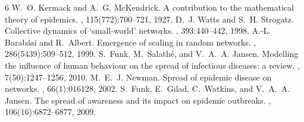\documentclass[11pt,a4paper]{article}
\begin{document}
\clearpage

\begin{thebibliography}{6}
W.~O. Kermack and A.~G. McKendrick.
\newblock A contribution to the mathematical theory of epidemics.
, 115(772):700--721,
  1927.
D.~J. Watts and S.~H. Strogatz.
\newblock Collective dynamics of `small-world' networks.
, 393:440--442, 1998.
A.-L. Barab\'asi and R.~Albert.
\newblock Emergence of scaling in random networks.
, 286(5439):509--512, 1999.
S.~Funk, M.~Salath\'e, and V.~A.~A. Jansen.
\newblock Modelling the influence of human behaviour on the spread of
  infectious diseases: a review.
, 7(50):1247--1256, 2010.
M.~E.~J. Newman.
\newblock Spread of epidemic disease on networks.
, 66(1):016128, 2002.
S.~Funk, E.~Gilad, C.~Watkins, and V.~A.~A. Jansen.
\newblock The spread of awareness and its impact on epidemic outbreaks.
,
106(16):6872--6877, 2009.
\end{thebibliography}
\end{document}
